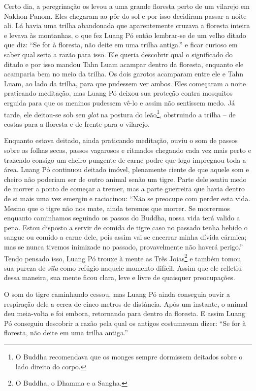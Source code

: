 Certo dia, a peregrinação os levou a uma grande floresta perto de um
vilarejo em Nakhon Panom. Eles chegaram ao pôr do sol e por isso
decidiram passar a noite ali. Lá havia uma trilha abandonada que
aparentemente cruzava a floresta inteira e levava às montanhas, o que
fez Luang Pó então lembrar-se de um velho ditado que diz: ``Se for à
floresta, não deite em uma trilha antiga.'' e ficar curioso em saber
qual seria a razão para isso. Ele queria descobrir qual o significado do
ditado e por isso mandou Tahn Luam acampar dentro da floresta, enquanto
ele acamparia bem no meio da trilha. Os dois garotos acamparam entre ele
e Tahn Luam, ao lado da trilha, para que pudessem ver ambos. Eles
começaram a noite praticando meditação, mas Luang Pó deixou sua proteção
contra mosquitos erguida para que os meninos pudessem vê-lo e assim não
sentissem medo. Já tarde, ele deitou-se sob seu \emph{glot} na postura
do leão\footnote{O Buddha recomendava que os monges sempre dormissem
  deitados sobre o lado direito do corpo.}, obstruindo a trilha -- de
costas para a floresta e de frente para o vilarejo.

Enquanto estava deitado, ainda praticando meditação, ouviu o som de
passos sobre as folhas secas, passos vagarosos e ritmados chegando cada
vez mais perto e trazendo consigo um cheiro pungente de carne podre que
logo impregnou toda a área. Luang Pó continuou deitado imóvel,
plenamente ciente de que aquele som e cheiro não poderiam ser de outro
animal senão um tigre. Parte dele sentiu medo de morrer a ponto de
começar a tremer, mas a parte guerreira que havia dentro de si mais uma
vez emergiu e raciocinou: ``Não se preocupe com perder esta vida. Mesmo
que o tigre não nos mate, ainda teremos que morrer. Se morrermos
enquanto caminhamos seguindo os passos do Buddha, nossa vida terá valido
a pena. Estou disposto a servir de comida de tigre caso no passado tenha
bebido o sangue ou comido a carne dele, pois assim vai se encerrar minha
dívida cármica; mas se nunca tivemos inimizade no passado, provavelmente
não haverá perigo.'' Tendo pensado isso, Luang Pó trouxe à mente as Três
Joias\footnote{O Buddha, o Dhamma e a Sangha.} e também tomou sua pureza
de \emph{sīla} como refúgio naquele momento difícil. Assim que ele
refletiu dessa maneira, sua mente ficou clara, leve e livre de quaisquer
preocupações.

O som do tigre caminhando cessou, mas Luang Pó ainda conseguia ouvir a
respiração dele a cerca de cinco metros de distância. Após um instante,
o animal deu meia-volta e foi embora, retornando para dentro da
floresta. E assim Luang Pó conseguiu descobrir a razão pela qual os
antigos costumavam dizer: ``Se for à floresta, não deite em uma trilha
antiga.''

